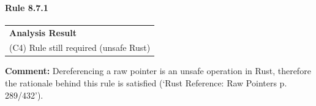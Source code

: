 \paragraph{Rule 8.7.1}
\begin{longtable}{p{13cm}}
\textbf{Analysis Result} \\
(C4) Rule still required (unsafe Rust) \\
\end{longtable}
\textbf{Comment:}  Dereferencing a raw pointer is an unsafe operation in Rust, therefore the rationale behind this rule is satisfied (`Rust Reference: Raw Pointers p. 289/432'). \\

